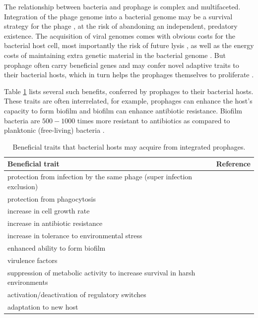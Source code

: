 The relationship between bacteria and prophage is complex and multifaceted. Integration of the phage genome into a bacterial genome may be a survival strategy for the phage \citep{refardt_tuning_2010}, at the risk of abandoning an independent, predatory existence. The acquisition of viral genomes comes with obvious costs for the bacterial host cell, most importantly the risk
of future lysis \citep{ptashne_genetic_2004}, as well as the energy costs of maintaining extra genetic material in the bacterial genome \citep{millan_interactions_2015}. But prophage often carry beneficial genes and may confer novel adaptive traits to their bacterial hosts, which in turn helps the prophages themselves to proliferate \citep{bobay_pervasive_2014}.  

Table \ref{table:bt} lists several such benefits, conferred by prophages to their bacterial hosts. These traits are often interrelated, for example, prophages can enhance the host's capacity to form biofilm and biofilm can enhance antibiotic resistance. Biofilm bacteria are $500 - 1000$ times more resistant to antibiotics as compared to planktonic  (free-living) bacteria \citep{harper_bacteriophages_2014}. 
    \begin{table}[t]
\centering
\begin{tabular}{p{7.8cm}p{7cm}}
\hline
Beneficial trait & Reference \\
\hline
protection from infection by the same phage (super infection exclusion) & \cite{canchaya_impact_2004,hofer_superinfection_1995}\\

protection from phagocytosis & \cite{meltz_steinberg_grazing_2007} \\

increase in cell growth rate & \cite{wang_cryptic_2010} \\

increase in antibiotic resistance & \cite{haaber_bacterial_2016, wang_cryptic_2010} \\

increase in tolerance to environmental stress & \cite{edlin_reproductive_1977, wang_cryptic_2010}\\

enhanced ability to form biofilm & \cite{wang_cryptic_2010, godeke_phage-induced_2011}\\
virulence factors & \cite{hacker_ecological_2001,fortier_importance_2013, banks_fundamental_2002}\\
 
suppression of metabolic activity
to increase survival in harsh environments & \cite{paul_prophages_2008}\\

activation/deactivation of regulatory switches   & \cite{feiner_new_2015}\\
 
adaptation to new host & \cite{diene_prophages_2017}\\
\hline
\end{tabular}
\caption{Beneficial traits that bacterial hosts may acquire from integrated prophages. }
\label{table:bt}
\end{table}
 
